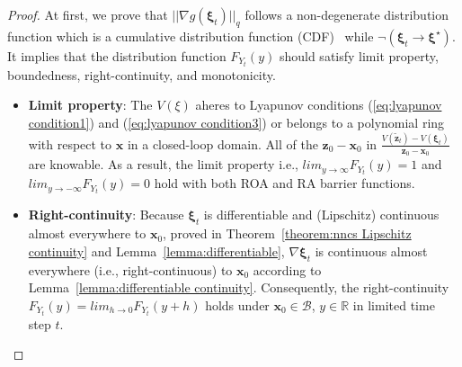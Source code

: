 \documentclass[conference]{IEEEtran}
\newtheorem{proof}{\bf Proof}
\newcommand{\roa}{\textsc{ROA}\xspace}
\newcommand{\ra}{\textsc{RA}\xspace}
\newcommand{\myvec}[1]{\boldsymbol{#1}}
\newcommand{\calA}{\mathcal{A}}
\newcommand{\calB}{\mathcal{B}}
\newcommand{\bbR}{\mathbb{R}}
\newcommand{\bbN}{\mathbb{N}}
\begin{document}
\begin{proof}\label{proof:different distributions}
  At first, we prove that $||\nabla g(\myvec{\xi}_{t})||_{q}$ 
  follows a non-degenerate distribution function which is a 
  cumulative distribution function (CDF)~\cite{burr1942cumulative} 
  while $\lnot(\myvec{\xi}_{t} \to \myvec{\xi}^{\star})$. It implies that 
  the distribution function $F_{Y_{t}}(y)$ 
  should satisfy limit property, boundedness, right-continuity, and monotonicity. 

  \begin{itemize}
    \item \textbf{Limit property}: 
    The $V(\xi)$ 
    aheres to Lyapunov conditions 
    (\ref{eq:lyapunov condition1}) and 
    (\ref{eq:lyapunov condition3}) or 
    belongs to a polynomial ring with 
    respect to $\myvec{x}$ in a closed-loop domain. 
    All of the $\myvec{z}_{0} - \myvec{x}_{0}$ 
    in $\frac{V(\tilde{\myvec{z}}_{t})-V(\myvec{\xi}_{t})}
    {\myvec{z}_{0} - \myvec{x}_{0}}$ are knowable. 
    As a result, the limit property i.e., $lim_{y\to \infty}F_{Y_{t}}(y) = 1$ and 
    $lim_{y\to -\infty}F_{Y_{t}}(y) = 0$ hold with both 
    \roa and \ra barrier functions. 

    \item \textbf{Right-continuity}: 
    Because $\myvec{\xi}_{t}$ is differentiable and (Lipschitz) 
    continuous almost everywhere to $\myvec{x}_{0}$, 
    proved in Theorem~\ref{theorem:nncs Lipschitz continuity} 
    and Lemma~\ref{lemma:differentiable}, 
    $\nabla\myvec{\xi}_{t}$ is continuous almost everywhere (i.e., right-continuous) 
    to $\myvec{x}_{0}$ according to Lemma~\ref{lemma:differentiable continuity}. 
    Consequently, the right-continuity $F_{Y_{t}}(y) = lim_{h\to 0}F_{Y_{t}}(y + h)$ 
    holds under $\myvec{x}_{0} \in \calB$, $y \in \bbR$ in 
    limited time step $t$.  


\end{itemize}
\end{proof}
\end{document}
